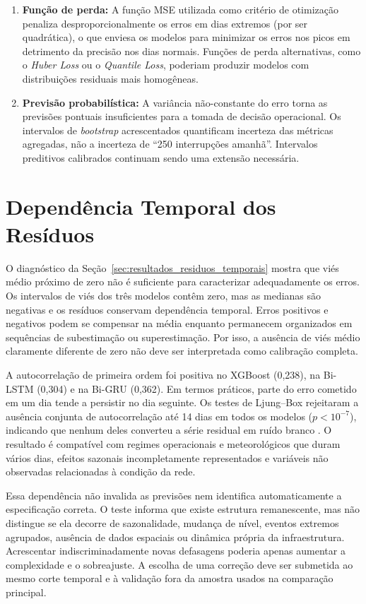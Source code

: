 \begin{enumerate}
    \item \textbf{Função de perda:} A função MSE utilizada como critério de otimização penaliza desproporcionalmente os erros em dias extremos (por ser quadrática), o que enviesa os modelos para minimizar os erros nos picos em detrimento da precisão nos dias normais. Funções de perda alternativas, como o \textit{Huber Loss} ou o \textit{Quantile Loss}, poderiam produzir modelos com distribuições residuais mais homogêneas.

    \item \textbf{Previsão probabilística:} A variância não-constante do erro torna as previsões pontuais insuficientes para a tomada de decisão operacional. Os intervalos de \textit{bootstrap} acrescentados quantificam incerteza das métricas agregadas, não a incerteza de ``250 interrupções amanhã''. Intervalos preditivos calibrados continuam sendo uma extensão necessária.
\end{enumerate}

\section{Dependência Temporal dos Resíduos}\label{sec:discussao_residuos_temporais}

O diagnóstico da Seção~\ref{sec:resultados_residuos_temporais} mostra que viés médio próximo de zero não é suficiente para caracterizar adequadamente os erros. Os intervalos de viés dos três modelos contêm zero, mas as medianas são negativas e os resíduos conservam dependência temporal. Erros positivos e negativos podem se compensar na média enquanto permanecem organizados em sequências de subestimação ou superestimação. Por isso, a ausência de viés médio claramente diferente de zero não deve ser interpretada como calibração completa.

A autocorrelação de primeira ordem foi positiva no XGBoost (0,238), na Bi-LSTM (0,304) e na Bi-GRU (0,362). Em termos práticos, parte do erro cometido em um dia tende a persistir no dia seguinte. Os testes de Ljung--Box rejeitaram a ausência conjunta de autocorrelação até 14 dias em todos os modelos ($p<10^{-7}$), indicando que nenhum deles converteu a série residual em ruído branco \cite{ljung1978measure}. O resultado é compatível com regimes operacionais e meteorológicos que duram vários dias, efeitos sazonais incompletamente representados e variáveis não observadas relacionadas à condição da rede.

Essa dependência não invalida as previsões nem identifica automaticamente a especificação correta. O teste informa que existe estrutura remanescente, mas não distingue se ela decorre de sazonalidade, mudança de nível, eventos extremos agrupados, ausência de dados espaciais ou dinâmica própria da infraestrutura. Acrescentar indiscriminadamente novas defasagens poderia apenas aumentar a complexidade e o sobreajuste. A escolha de uma correção deve ser submetida ao mesmo corte temporal e à validação fora da amostra usados na comparação principal.

